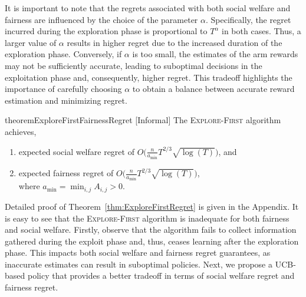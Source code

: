 It is important to note that the regrets associated with both social welfare and fairness are influenced by the choice of the parameter $\alpha$. Specifically, the regret incurred during the exploration phase is proportional to $T^{\alpha}$ in both cases. Thus, a larger value of $\alpha$ results in higher regret due to the increased duration of the exploration phase. Conversely, if $\alpha$ is too small, the estimates of the arm rewards may not be sufficiently accurate, leading to suboptimal decisions in the exploitation phase and, consequently, higher regret. This tradeoff highlights the importance of carefully choosing $\alpha$ to obtain a  balance between accurate reward estimation and minimizing regret.




\noindent






\iffalse 
\begin{restatable}{theorem}{ExploreFirstRegret}
\label{thm:ExploreFirstRegret}
The  \textsc{Explore-First} algorithm achieves expected social welfare regret of $\tilde{O} \big (\frac{n}{ \sqrt{a}} T^{2/3} \sqrt{\log(T)} \big )  $. 
\end{restatable}\fi 

\begin{restatable}{theorem}{ExploreFirstFairnessRegret} [Informal]
\label{thm:ExploreFirstRegret}
The  \textsc{Explore-First} algorithm achieves, 

\begin{enumerate}
    \item expected social welfare  regret of $O \Big(\frac{n}{a_{\min}} T^{2/3} \sqrt{\log(T)} \Big)  $,  and 
    \item expected fairness regret of $O \Big(\frac{n}{a_{\min}} T^{2/3} \sqrt{\log(T)} \Big)  $,\\
    where $a_{\min}=\min_{i,j}A_{i,j}>0$. 
\end{enumerate} 
\end{restatable}
Detailed proof of Theorem~\ref{thm:ExploreFirstRegret} is given in the Appendix. It is easy to see that the \textsc{Explore-First} algorithm is inadequate for both fairness and social welfare. Firstly, observe that the algorithm fails to collect information gathered during the exploit phase and, thus, ceases learning after the exploration phase. This impacts both social welfare and fairness regret guarantees, as inaccurate estimates can result in suboptimal policies. Next, we propose a UCB-based policy that provides a better tradeoff in terms of social welfare regret and fairness regret. 


